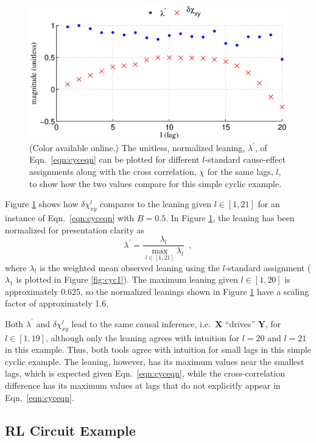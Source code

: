 \documentclass[twocolumn,aps,pre,groupedaddress]{revtex4-1}
\begin{document}
\begin{figure}[ht]
\includegraphics[scale=0.40]{SimpleCyclicexample_difflags.eps}
\caption{(Color available online.) The unitless, normalized leaning, $\lambda^\prime$, of Eqn.\ \ref{eqn:cyceqn} can be plotted for different $l$-standard cause-effect assignments along with the cross correlation, $\chi$ for the same lags, $l$, to show how the two values compare for this simple cyclic example.}
\label{fig:cyc2}
\end{figure}
Figure \ref{fig:cyc2} shows how $\delta\chi_{xy}^l$ compares to the leaning given $l\in[1,21]$ for an instance of Eqn.\ \ref{eqn:cyceqn} with $B=0.5$.  In Figure \ref{fig:cyc2}, the leaning has been normalized for presentation clarity as
\begin{equation}
\lambda^\prime = \frac{\lambda_l}{\max_{l\in[1,21]} \lambda_l}\;\;,
\end{equation}
where $\lambda_l$ is the weighted mean observed leaning using the $l$-standard assignment ($\lambda_1$ is plotted in Figure \ref{fig:cyc1}).  The maximum leaning given $l\in[1,20]$ is approximately 0.625, so the normalized leanings shown in Figure \ref{fig:cyc2} have a scaling factor of approximately 1.6.  

Both $\lambda^\prime$ and $\delta\chi_{xy}^l$ lead to the same causal inference, i.e.\ $\mathbf{X}$ ``drives'' $\mathbf{Y}$, for $l\in[1,19]$, although only the leaning agrees with intuition for $l=20$ and $l=21$ in this example.  Thus, both tools agree with intuition for small lags in this simple cyclic example.  The leaning, however, has its maximum values near the smallest lags, which is expected given Eqn.\ \ref{eqn:cyceqn}, while the cross-correlation difference has its maximum values at lags that do not explicitly appear in Eqn.\ \ref{eqn:cyceqn}.  

\subsection{RL Circuit Example}
\label{sec:rlcirc}
\end{document}
